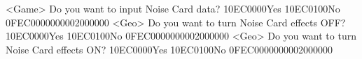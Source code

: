 <Game> Do you want to input Noise Card data? {10}{EC}{00}{00}Yes {10}{EC}{01}{00}No {0F}{EC}{00}{00}{00}{00}{02}{00}{00}{00}
<Geo> Do you want to turn Noise Card effects OFF? {10}{EC}{00}{00}Yes {10}{EC}{01}{00}No {0F}{EC}{00}{00}{00}{00}{02}{00}{00}{00}
<Geo> Do you want to turn Noise Card effects ON? {10}{EC}{00}{00}Yes {10}{EC}{01}{00}No {0F}{EC}{00}{00}{00}{00}{02}{00}{00}{00}

